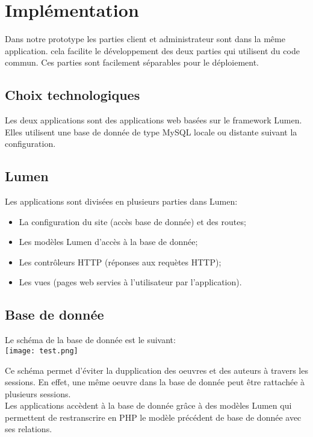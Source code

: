 \documentclass[a4paper]{article}
\begin{document}
\newpage
\section{Implémentation}
Dans notre prototype les parties client et administrateur sont dans la même application. cela facilite le développement des deux parties qui utilisent du code commun. Ces parties sont facilement séparables pour le déploiement.
\subsection{Choix technologiques}
Les deux applications sont des applications web basées sur le framework Lumen. Elles utilisent une base de donnée de type MySQL locale ou distante suivant la configuration.

\subsection{Lumen}
Les applications sont divisées en plusieurs parties dans Lumen:
\begin{itemize}
\item La configuration du site (accès base de donnée) et des routes;
\item Les modèles Lumen d'accès à la base de donnée;
\item Les contrôleurs HTTP (réponses aux requètes HTTP);
\item Les vues (pages web servies à l'utilisateur par l'application).
\end{itemize}

\subsection{Base de donnée}
Le schéma de la base de donnée est le suivant:\\
\newline
\texttt{[image: test.png]}

Ce schéma permet d'éviter la dupplication des oeuvres et des auteurs à travers les sessions. En effet, une même oeuvre dans la base de donnée peut être rattachée à plusieurs sessions.\\
Les applications accèdent à la base de donnée grâce à des modèles Lumen qui permettent de restranscrire en PHP le modèle précédent de base de donnée avec ses relations.
\end{document}
